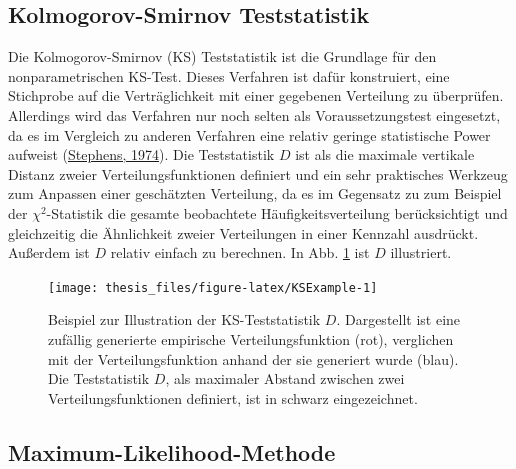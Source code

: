 \documentclass[
  12pt,
  openany]{book}
\begin{document}
\hypertarget{kolmogorov-smirnov-teststatistik}{%
\subsection{Kolmogorov-Smirnov Teststatistik}\label{kolmogorov-smirnov-teststatistik}}

Die Kolmogorov-Smirnov (KS) Teststatistik ist die Grundlage für den nonparametrischen KS-Test. Dieses Verfahren ist dafür konstruiert, eine Stichprobe auf die Verträglichkeit mit einer gegebenen Verteilung zu überprüfen. Allerdings wird das Verfahren nur noch selten als Voraussetzungstest eingesetzt, da es im Vergleich zu anderen Verfahren eine relativ geringe statistische Power aufweist (\protect\hyperlink{ref-stephensEDFStatisticsGoodness1974}{Stephens, 1974}). \newline
Die Teststatistik \(D\) ist als die maximale vertikale Distanz zweier Verteilungsfunktionen definiert und ein sehr praktisches Werkzeug zum Anpassen einer geschätzten Verteilung, da es im Gegensatz zu zum Beispiel der \(\chi^2\)-Statistik die gesamte beobachtete Häufigkeitsverteilung berücksichtigt und gleichzeitig die Ähnlichkeit zweier Verteilungen in einer Kennzahl ausdrückt. Außerdem ist \(D\) relativ einfach zu berechnen. In Abb. \ref{fig:KSExample} ist \(D\) illustriert.





\begin{figure}

{\centering \texttt{[image: thesis\_files/figure-latex/KSExample-1]} 

}

\caption[Beispiel zur Illustration der KS-Teststatistik \(D\).]{Beispiel zur Illustration der KS-Teststatistik \(D\). Dargestellt ist eine zufällig generierte empirische Verteilungsfunktion (rot), verglichen mit der Verteilungsfunktion anhand der sie generiert wurde (blau). Die Teststatistik \(D\), als maximaler Abstand zwischen zwei Verteilungsfunktionen definiert, ist in schwarz eingezeichnet.}\label{fig:KSExample}
\end{figure}

\hypertarget{maximum-likelihood-methode}{%
\subsection{Maximum-Likelihood-Methode}\label{maximum-likelihood-methode}}
\end{document}
